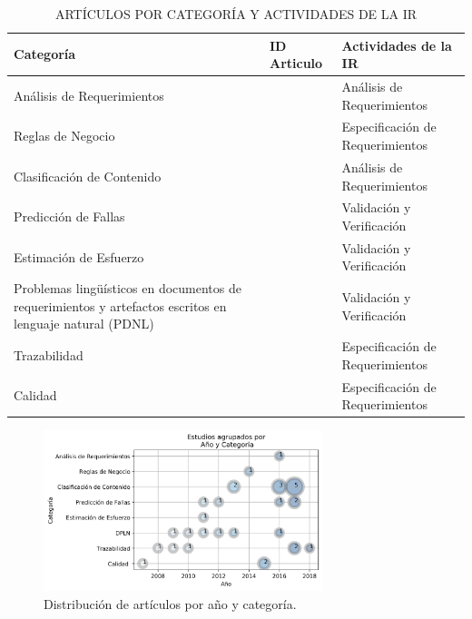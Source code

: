 \documentclass[journal]{IEEEtran}
\begin{document}
\begin{table}[!t]
\renewcommand{\arraystretch}{1.3}
\caption{ARTÍCULOS POR CATEGORÍA Y ACTIVIDADES DE LA IR}
\label{tabla3}
\centering
\begin{tabular}{p{2.8cm}p{1.7cm}p{3cm}}
\hline
\hline
Categoría & ID Articulo & Actividades de la IR \\
\hline
Análisis de Requerimientos & \cite{Wang2016} & Análisis de Requerimientos \\ \cline{1-3}
Reglas de Negocio & \cite{sharma2014automated} & Especificación de Requerimientos \\ \cline{1-3}
Clasificación de Contenido & \cite{li2017identifying,Jindal20162027,kurtanovic2017automatically,dekhtyar2017re,abad2017works,Slankas2013,Slankas2013a,Merten2016,winkler2016automatic} & Análisis de Requerimientos \\ \cline{1-3}
Predicción de Fallas & \cite{del2017stability,dargan2016systems,fitzgerald2012early,malhotra2017exploratory,del2011requirement} & Validación y Verificación \\ \cline{1-3}
Estimación de Esfuerzo & \cite{Abdukalykov2011158} & Validación y Verificación\\ \cline{1-3}
Problemas lingüísticos en documentos de requerimientos y
artefactos escritos en lenguaje natural (PDNL) &\cite{yang2010extending,yang2012speculative,Knauss201685,Yang2011,Ott2013,nikora2009automated} & Validación y Verificación \\ \cline{1-3}
Trazabilidad &\cite{Li201725,Cleland-Huang2010,gokyer2008non,Mills2017,Sardinha2013,AtasM.2018} & Especificación de Requerimientos  \\ \cline{1-3}
Calidad & \cite{Parra2015180,Hayes2015,Hussain2007} & Especificación de Requerimientos \\
\hline \hline                                                                                                    
\end{tabular}
\end{table}

\begin{figure}[!t]
\centering
\includegraphics[width=3.2in]{figures/Figure8_Guada.png}
\caption{Distribución de artículos por año y categoría.}
\label{fig:8}
\end{figure}
\end{document}
